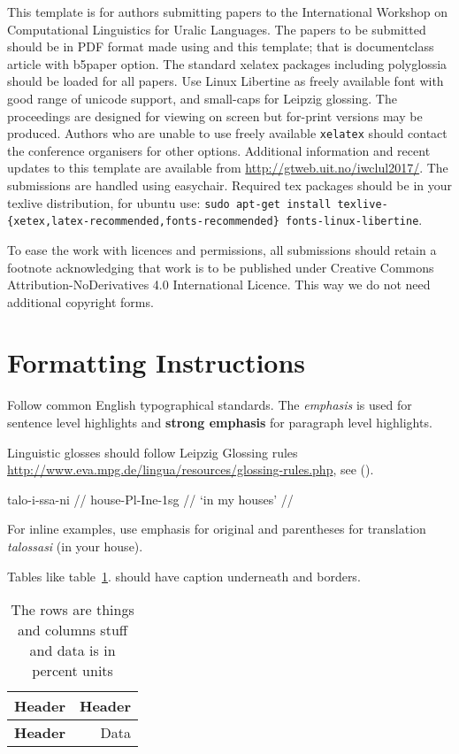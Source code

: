 \documentclass[b5paper,notitlepage]{article}
\begin{document}
This template is for authors submitting papers to the International Workshop
on Computational Linguistics for Uralic Languages. The papers to be submitted
should be in PDF format made using \XeLaTeX{} and this template; that is
documentclass article with b5paper option. The standard xelatex packages
including polyglossia should be loaded for all papers.  Use Linux Libertine as
freely available font with good range of unicode support, and small-caps for
Leipzig glossing. The proceedings are designed for viewing on screen but
for-print versions may be produced.  Authors who are unable to use freely
available \texttt{xelatex} should contact the conference organisers for other
options. Additional information and recent updates to this template are
available from \url{http://gtweb.uit.no/iwclul2017/}. The submissions are
handled using easychair. Required tex packages should be in your texlive
distribution, for ubuntu use: \texttt{sudo apt-get install
texlive-\{xetex,latex-recommended,fonts-recommended\} fonts-linux-libertine}.

To ease the work with licences and permissions, all submissions should retain
a footnote acknowledging that work is to be published under Creative
Commons Attribution-NoDerivatives 4.0 International Licence. This way we do not
need additional copyright forms.

\section{Formatting Instructions}

Follow common English typographical standards. The \emph{emphasis} is used for
sentence level highlights and \textbf{strong emphasis} for paragraph level
highlights.

Linguistic glosses should follow Leipzig Glossing rules
\url{http://www.eva.mpg.de/lingua/resources/glossing-rules.php}, see (\nextx).

\ex
\begingl
\gla talo-i-ssa-ni //
\glb house-{\sc Pl}-{\sc Ine}-{\sc 1sg} //
\glft `in my houses' //
\endgl
\xe

For inline examples, use emphasis for original and parentheses for translation
\emph{talossasi} (in your house).

Tables like table~\ref{table:example}. should have caption underneath and
borders.

\begin{table}
    \center
    \begin{tabular}{|l|r|}
        \hline
        \bf Header & \bf Header \\
        \hline
        \bf Header & Data \\
        \hline
    \end{tabular}
    \caption{The rows are things and columns stuff and data is in percent units
    \label{table:example}}
\end{table}
\end{document}
